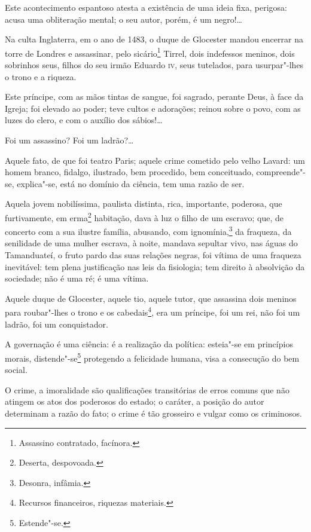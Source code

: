 Este acontecimento espantoso atesta a existência de uma ideia fixa,
perigosa: acusa uma obliteração mental; o seu autor, porém, é um
negro!\ldots{}

\asterisc

Na culta Inglaterra, em o ano de 1483, o duque de Glocester mandou
encerrar na torre de Londres e assassinar, pelo sicário\footnote{
  Assassino contratado, facínora.} Tirrel, dois indefessos meninos, dois
sobrinhos seus, filhos do seu irmão Eduardo \textsc{iv}, seus tutelados, para
usurpar"-lhes o trono e a riqueza.

Este príncipe, com as mãos tintas de sangue, foi sagrado, perante Deus,
à face da Igreja; foi elevado ao poder; teve cultos e adorações; reinou
sobre o povo, com as luzes do clero, e com o auxílio dos sábios!\ldots{}

Foi um assassino? Foi um ladrão?\ldots{}

\asterisc

Aquele fato, de que foi teatro Paris; aquele crime cometido pelo velho
Lavard: um homem branco, fidalgo, ilustrado, bem procedido, bem
conceituado, compreende"-se, explica"-se, está no domínio da ciência, tem
uma razão de ser.

Aquela jovem nobilíssima, paulista distinta, rica, importante, poderosa,
que furtivamente, em erma\footnote{Deserta, despovoada.} habitação,
dava à luz o filho de um escravo; que, de concerto com a sua ilustre
família, abusando, com ignomínia,\footnote{Desonra, infâmia.} da
fraqueza, da senilidade de uma mulher escrava, à noite, mandava sepultar
vivo, nas águas do Tamanduateí, o fruto pardo das suas relações negras,
foi vítima de uma fraqueza inevitável: tem plena justificação nas leis
da fisiologia; tem direito à absolvição da sociedade; não é uma ré; é
uma vítima.

Aquele duque de Glocester, aquele tio, aquele tutor, que assassina dois
meninos para roubar"-lhes o trono e os cabedais\footnote{Recursos
  financeiros, riquezas materiais.}, era um príncipe, foi um rei, não
foi um ladrão, foi um conquistador.

A governação é uma ciência: é a realização da política: esteia"-se em
princípios morais, distende"-se\footnote{Estende"-se.} protegendo a
felicidade humana, visa a consecução do bem social.

O crime, a imoralidade são qualificações transitórias de erros comuns
que não atingem os atos dos poderosos do estado; o caráter, a posição do
autor determinam a razão do fato; o crime é tão grosseiro e vulgar como
os criminosos.

